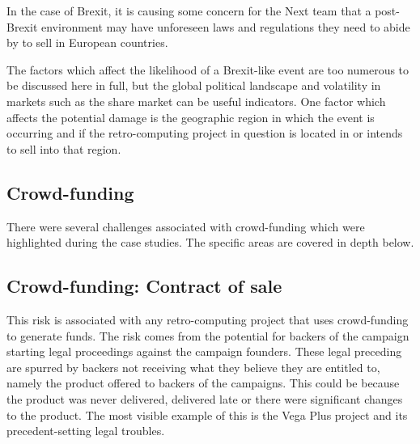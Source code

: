 In the case of Brexit, it is causing some concern for the Next team that a post-Brexit environment may have unforeseen laws and regulations they need to abide by to sell in European countries. 

The factors which affect the likelihood of a Brexit-like event are too numerous to be discussed here in full, but the global political landscape and volatility in markets such as the share market can be useful indicators. One factor which affects the potential damage is the geographic region in which the event is occurring and if the retro-computing project in question is located in or intends to sell into that region.



  
\subsection{Crowd-funding}
There were several challenges associated with crowd-funding which were highlighted during the case studies. The specific areas are covered in depth below. 


\subsection{Crowd-funding: Contract of sale}
This risk is associated with any retro-computing project that uses crowd-funding to generate funds. The risk comes from the potential for backers of the campaign starting legal proceedings against the campaign founders. These legal preceding are spurred by backers not receiving what they believe they are entitled to, namely the product offered to backers of the campaigns. This could be because the product was never delivered, delivered late or there were significant changes to the product. The most visible example of this is the Vega Plus project and its precedent-setting legal troubles. 

